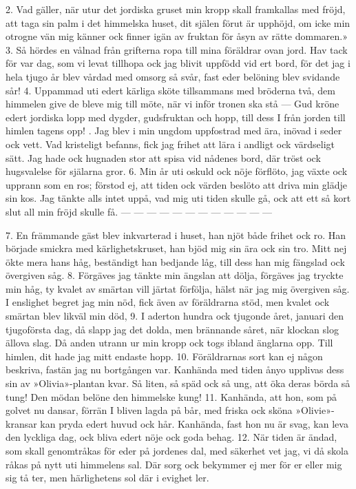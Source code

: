 \setlength{\columnsep}{0.2cm}
\begin{multicols}{2}
2.  Vad gäller, när utur det jordiska gruset
    min kropp skall framkallas med fröjd,
    att taga sin palm i det himmelska huset,
    dit själen förut är upphöjd,
    om icke min otrogne vän
    mig känner ock finner igän
    av fruktan för åsyn av rätte dommaren.»
3.  Så hördes en vålnad från grifterna ropa
    till mina föräldrar ovan jord.
    Hav tack för var dag, som vi levat tillhopa
    ock jag blivit uppfödd vid ert bord,
    för det jag i hela tjugo år
    blev vårdad med omsorg så svår,
    fast eder belöning blev svidande sår!
4.  Uppammad uti edert kärliga sköte
    tillsammans med bröderna två,
    dem himmelen give de bleve mig till möte,
    när vi inför tronen ska stå —
    Gud kröne edert jordiska lopp
    med dygder, gudsfruktan och hopp,
    till dess I från jorden till himlen tagens opp!
\vfill{}.  Jag blev i min ungdom uppfostrad med ära,
    inövad i seder ock vett.
    Vad kristeligt befanns, fick jag frihet att lära
    i andligt ock värdseligt sätt.
    Jag hade ock hugnaden stor
    att spisa vid nådenes bord,
    där tröst ock hugsvalelse för själarna gror.
6.  Min år uti oskuld ock nöje förflöto,
    jag växte ock upprann som en ros;
    förstod ej, att tiden ock värden beslöto
    att driva min glädje sin kos.
    Jag tänkte alls intet uppå,
    vad mig uti tiden skulle gå,
    ock att ett så kort slut all min fröjd skulle få.
    — — — — — — — — — — — —
\end{multicols}
\newpage
\begin{multicols}{2}
7.  En främmande gäst blev inkvarterad i huset,
    han njöt både frihet ock ro.
    Han började smickra med kärlighetskruset,
    han bjöd mig sin ära ock sin tro.
    Mitt nej ökte mera hans håg,
    beständigt han bedjande låg,
    till dess han mig fängslad ock övergiven såg.
8.  Förgäves jag tänkte min ängslan att dölja,
    förgäves jag tryckte min håg,
    ty kvalet av smärtan vill järtat förfölja,
    hälst när jag mig övergiven såg.
    I enslighet begret jag min nöd,
    fick även av föräldrarna stöd,
    men kvalet ock smärtan blev likväl min död,
9.  I aderton hundra ock tjugonde året,
    januari den tjugoförsta dag,
    då slapp jag det dolda, men brännande såret,
    när klockan slog ällova slag.
    Då anden utrann ur min kropp
    ock togs ibland änglarna opp.
    Till himlen, dit hade jag mitt endaste hopp.
10. Föräldrarnas sort kan ej någon beskriva,
    fastän jag nu bortgången var.
    Kanhända med tiden ånyo upplivas
    dess sin av »Olivia»-plantan kvar.
    Så liten, så späd ock så ung,
    att öka deras börda så tung!
    Den mödan belöne den himmelske kung!
11. Kanhända, att hon, som på golvet nu dansar,
    förrän I bliven lagda på bår,
    med friska ock sköna »Olivie»-kransar
    kan pryda edert huvud ock hår.
    Kanhända, fast hon nu är svag,
    kan leva den lyckliga dag,
    ock bliva edert nöje ock goda behag.
12. När tiden är ändad, som skall genomtråkas
    för eder på jordenes dal,
    med säkerhet vet jag, vi då skola råkas
    på nytt uti himmelens sal.
    Där sorg ock bekymmer ej mer
    för er eller mig sig tå ter,
    men härlighetens sol där i evighet ler.
\end{multicols}
